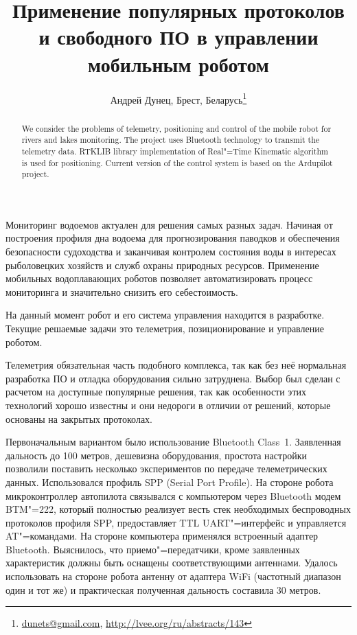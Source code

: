 \documentclass[10pt, a5paper]{article}
\begin{document}
\title{Применение популярных протоколов и свободного ПО в управлении мобильным роботом}
\author{Андрей Дунец, Брест, Беларусь\footnote{\url{dunets@gmail.com}, \url{http://lvee.org/ru/abstracts/143}}}
\maketitle
\begin{abstract}
We consider the problems of telemetry, positioning and cont\-rol of the mobile robot for rivers and lakes monitoring. The project uses Bluetooth technology to transmit the telemetry data. RTKLIB library implementation of Real"=Time Kinematic algo\-rithm is used for positioning. Current version of the control system is based on the Ardupilot project.
\end{abstract}
Мониторинг водоемов актуален для решения самых разных задач. Начиная от построения профиля дна водоема для прогнозирования паводков и обеспечения безопасности судоходства и заканчивая контролем состояния воды в интересах рыболовецких хозяйств и служб охраны природных ресурсов. Применение мобильных водоплавающих роботов позволяет автоматизировать процесс мониторинга и значительно снизить его себестоимость.

На данный момент робот и его система управления находится в разработке. Текущие решаемые задачи это телеметрия, позиционирование и управление роботом.

Телеметрия обязательная часть подобного комплекса, так как без неё нормальная разработка ПО и отладка оборудования сильно затруднена. Выбор был сделан с расчетом на доступные популярные решения, так как особенности этих технологий хорошо известны и они недороги в отличии от решений, которые основаны на закрытых протоколах.

Первоначальным вариантом было использование Bluetooth \linebreak Class~1. Заявленная дальность до 100 метров, дешевизна оборудования, простота настройки позволили поставить несколько экспериментов по передаче телеметрических данных. Использовался профиль SPP (Serial Port Profile). На стороне робота микроконтроллер автопилота связывался с компьютером через Bluetooth модем BTM"=222, который полностью реализует весть стек необходимых беспроводных протоколов профиля SPP, предоставляет TTL UART"=интерфейс и управляется AT"=командами. На стороне компьютера применялся встроенный адаптер Bluetooth. Выяснилось, что приемо"=передатчики, кроме заявленных характеристик должны быть оснащены соответствующими антеннами. Удалось использовать на стороне робота антенну от адаптера WiFi (частотный диапазон один и тот же) и практическая полученная дальность составила 30 метров.
\end{document}
